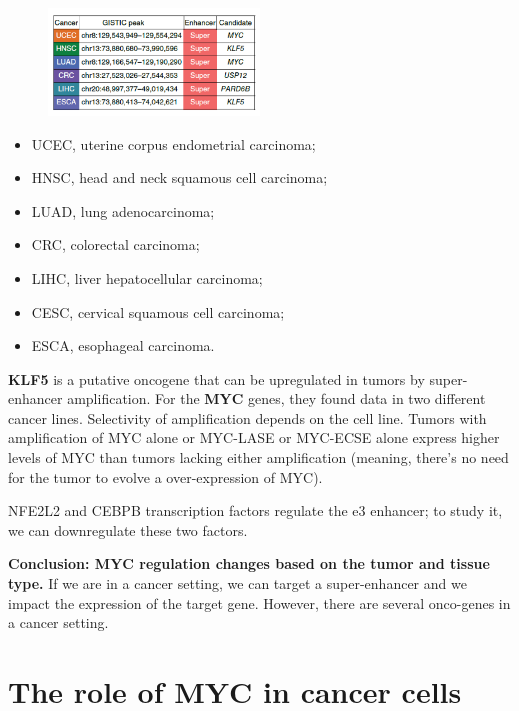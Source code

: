 \begin{figure}
\centering
\includegraphics[width=0.5\textwidth]{../_resources/796c982294bedb0a7994a942aa5ff2a5.png}
\caption{}
\label{fig:study}
\end{figure}

\begin{itemize}
\item UCEC, uterine corpus endometrial carcinoma; 
\item HNSC, head and neck squamous cell carcinoma; 
\item LUAD, lung adenocarcinoma; 
\item CRC, colorectal carcinoma; 
\item LIHC, liver hepatocellular carcinoma; 
\item CESC, cervical squamous cell carcinoma; 
\item ESCA, esophageal carcinoma.
\end{itemize}

\textbf{KLF5} is a putative oncogene that can be upregulated in tumors by super-enhancer amplification.
For the \textbf{MYC} genes, they found data in two different cancer lines. Selectivity of amplification depends on the cell line.
Tumors with amplification of MYC alone or MYC-LASE or MYC-ECSE alone express higher levels of MYC than tumors lacking either amplification (meaning, there's no need for the tumor to evolve a over-expression of MYC).

NFE2L2 and CEBPB transcription factors regulate the e3 enhancer; to study it, we can downregulate these two factors.

\textbf{Conclusion: MYC regulation changes based on the tumor and tissue type.}
If we are in a cancer setting, we can target a super-enhancer and we impact the expression of the target gene. However, there are several onco-genes in a cancer setting.

\hypertarget{the-role-of-myc-in-cancer-cells}{%
\section{The role of MYC in cancer cells}\label{the-role-of-myc-in-cancer-cells}}

